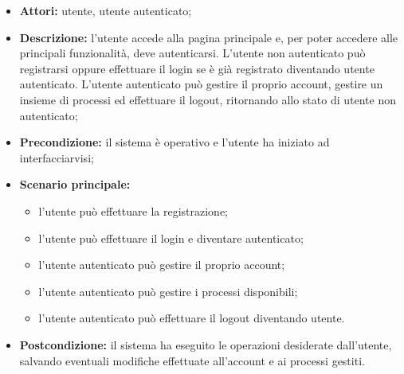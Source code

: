 \begin{itemize}
\item \textbf{Attori:} utente, utente autenticato;
\item \textbf{Descrizione:} l'utente accede alla pagina principale e, per poter accedere alle principali funzionalità, deve autenticarsi.
L'utente non autenticato può registrarsi oppure effettuare il login se è già registrato diventando utente autenticato.
L'utente autenticato può gestire il proprio account, gestire un insieme di processi ed effettuare il logout, ritornando allo stato di utente non autenticato;
\item \textbf{Precondizione:} il sistema è operativo e l'utente ha iniziato ad interfacciarvisi;
\item \textbf{Scenario principale:}
\begin{itemize}
\item l'utente può effettuare la registrazione;
\item l'utente può effettuare il login e diventare autenticato;
\item l'utente autenticato può gestire il proprio account;
\item l'utente autenticato può gestire i processi disponibili;
\item l'utente autenticato può effettuare il logout diventando utente.
\end{itemize}
\item \textbf{Postcondizione:} il sistema ha eseguito le operazioni desiderate dall'utente, salvando eventuali modifiche effettuate all'account e ai processi gestiti.
\end{itemize}

